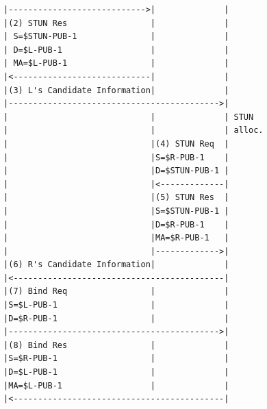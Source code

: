 \documentclass{article}
\begin{document}
\begin{verbatim}
             |---------------------------->|              |
             |(2) STUN Res                 |              |
             | S=$STUN-PUB-1               |              |
             | D=$L-PUB-1                  |              |
             | MA=$L-PUB-1                 |              |
             |<----------------------------|              |
             |(3) L's Candidate Information|              |
             |------------------------------------------->|
             |                             |              | STUN
             |                             |              | alloc.
             |                             |(4) STUN Req  |
             |                             |S=$R-PUB-1    |
             |                             |D=$STUN-PUB-1 |
             |                             |<-------------|
             |                             |(5) STUN Res  |
             |                             |S=$STUN-PUB-1 |
             |                             |D=$R-PUB-1    |
             |                             |MA=$R-PUB-1   |
             |                             |------------->|
             |(6) R's Candidate Information|              |
             |<-------------------------------------------|
             |(7) Bind Req                 |              |
             |S=$L-PUB-1                   |              |
             |D=$R-PUB-1                   |              |
             |------------------------------------------->|
             |(8) Bind Res                 |              |
             |S=$R-PUB-1                   |              |
             |D=$L-PUB-1                   |              |
             |MA=$L-PUB-1                  |              |
             |<-------------------------------------------|



\end{verbatim}
\end{document}
